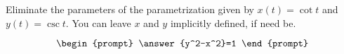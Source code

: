 \documentclass{ximera}
\author{Gregory Hartman \and Matthew Carr}
\begin{document}
\begin{exercise}




Eliminate the parameters of the parametrization given by $x(t)=\cot t$ and $y(t)=\csc t$. You can leave $x$ and $y$ implicitly defined, if need be.

\[
\begin{prompt}
\answer{y^2-x^2}=1
\end{prompt}
\]

\end{exercise}
\end{document}
